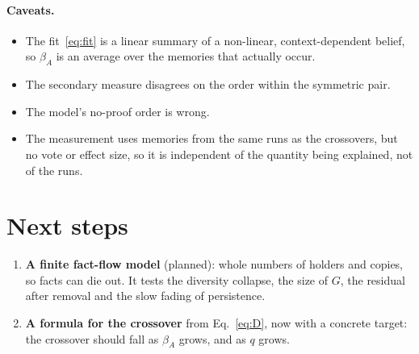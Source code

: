 \documentclass[10pt,a4paper]{article}
\begin{document}
\paragraph{Caveats.}
\begin{itemize}
\item The fit~\eqref{eq:fit} is a linear summary of a non-linear, context-dependent belief, so $\beta_A$ is an average
  over the memories that actually occur.
\item The secondary measure disagrees on the order within the symmetric pair.
\item The model's no-proof order is wrong.
\item The measurement uses memories from the same runs as the crossovers, but no vote or effect size, so it is
  independent of the quantity being explained, not of the runs.
\end{itemize}

\section{Next steps}
\begin{enumerate}
\item \textbf{A finite fact-flow model} (planned): whole numbers of holders and copies, so facts can die out. It tests the
  diversity collapse, the size of $G$, the residual after removal and the slow fading of persistence.
\item \textbf{A formula for the crossover} from Eq.~\eqref{eq:D}, now with a concrete target: the crossover should fall as
  $\beta_A$ grows, and as $q$ grows.
\end{enumerate}
\end{document}
